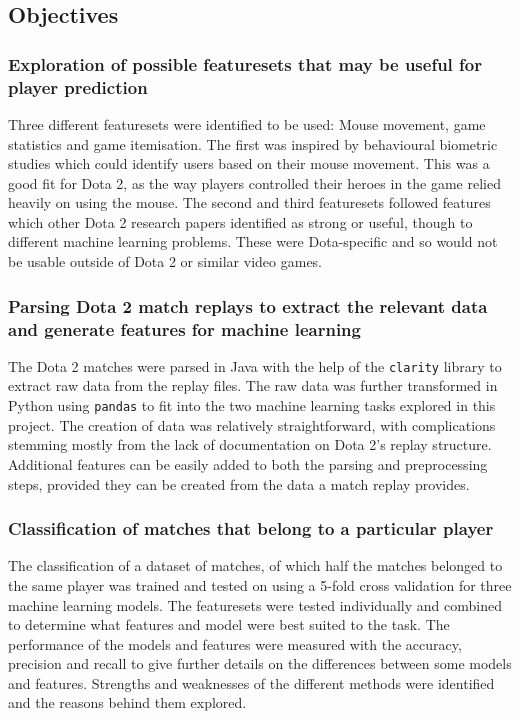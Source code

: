 \documentclass[Report.tex]{subfiles}
\begin{document}
\subsection{Objectives}

\subsubsection{Exploration of possible featuresets that may be useful for player prediction}
Three different featuresets were identified to be used: Mouse movement, game statistics and game itemisation. The first was inspired by behavioural biometric studies which could identify users based on their mouse movement. This was a good fit for Dota 2, as the way players controlled their heroes in the game relied heavily on using the mouse. The second and third featuresets followed features which other Dota 2 research papers identified as strong or useful, though to different machine learning problems. These were Dota-specific and so would not be usable outside of Dota 2 or similar video games. 

\subsubsection{Parsing Dota 2 match replays to extract the relevant data and generate features for machine learning}
The Dota 2 matches were parsed in Java with the help of the \texttt{clarity} library to extract raw data from the replay files. The raw data was further transformed in Python using \texttt{pandas} to fit into the two machine learning tasks explored in this project. The creation of data was relatively straightforward, with complications stemming mostly from the lack of documentation on Dota 2's replay structure. Additional features can be easily added to both the parsing and preprocessing steps, provided they can be created from the data a match replay provides.

\subsubsection{Classification of matches that belong to a particular player}
The classification of a dataset of matches, of which half the matches belonged to the same player was trained and tested on using a 5-fold cross validation for three machine learning models. The featuresets were tested individually and combined to determine what features and model were best suited to the task. The performance of the models and features were measured with the accuracy, precision and recall to give further details on the differences between some models and features. Strengths and weaknesses of the different methods were identified and the reasons behind them explored. 
\end{document}
